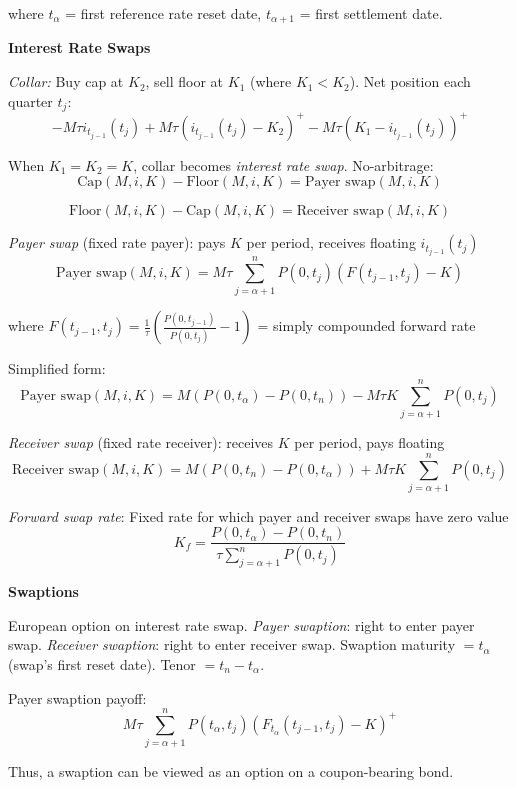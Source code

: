 \documentclass[12pt,a4paper]{article}
\begin{document}
where $t_\alpha$ = first reference rate reset date, $t_{\alpha+1}$ = first settlement date.

\vspace{0.5em}

\textbf{Interest Rate Swaps}
\vspace{0.5em}

\textit{Collar:} Buy cap at $K_2$, sell floor at $K_1$ (where $K_1 < K_2$). Net position each quarter $t_j$:
$$-M\tau i_{t_{j-1}}(t_j) + M\tau(i_{t_{j-1}}(t_j) - K_2)^+ - M\tau(K_1 - i_{t_{j-1}}(t_j))^+$$

When $K_1 = K_2 = K$, collar becomes \textit{interest rate swap}. No-arbitrage:
$$\text{Cap}(M, i, K) - \text{Floor}(M, i, K) = \text{Payer swap}(M, i, K)$$

$$\text{Floor}(M, i, K) - \text{Cap}(M, i, K) = \text{Receiver swap}(M, i, K)$$

\textit{Payer swap} (fixed rate payer): pays $K$ per period, receives floating $i_{t_{j-1}}(t_j)$
$$\text{Payer swap}(M, i, K) = M\tau \sum_{j=\alpha+1}^{n} P(0, t_j)(F(t_{j-1}, t_j) - K)$$

where $F(t_{j-1}, t_j) = \frac{1}{\tau}\left(\frac{P(0,t_{j-1})}{P(0,t_j)} - 1\right)$ = simply compounded forward rate

Simplified form:
$$\text{Payer swap}(M, i, K) = M(P(0, t_\alpha) - P(0, t_n)) - M\tau K\sum_{j=\alpha+1}^{n} P(0, t_j)$$

\textit{Receiver swap} (fixed rate receiver): receives $K$ per period, pays floating
$$\text{Receiver swap}(M, i, K) = M(P(0, t_n) - P(0, t_\alpha)) + M\tau K\sum_{j=\alpha+1}^{n} P(0, t_j)$$

\textit{Forward swap rate}: Fixed rate for which payer and receiver swaps have zero value
$$K_f = \frac{P(0, t_\alpha) - P(0, t_n)}{\tau \sum_{j=\alpha+1}^{n} P(0, t_j)}$$

\vspace{0.5em}

\textbf{Swaptions}
\vspace{0.5em}

European option on interest rate swap. \textit{Payer swaption}: right to enter payer swap. \textit{Receiver swaption}: right to enter receiver swap. Swaption maturity $= t_\alpha$ (swap's first reset date). Tenor $= t_n - t_\alpha$.

Payer swaption payoff:
$$M\tau \sum_{j=\alpha+1}^{n} P(t_\alpha, t_j)(F_{t_\alpha}(t_{j-1}, t_j) - K)^+$$

Thus, a swaption can be viewed as an option on a coupon-bearing bond.
\end{document}
